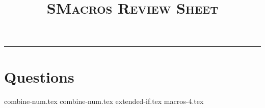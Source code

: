 \documentclass{exam}
\title{\textsc{SMacros Review Sheet}}
\begin{document}
\maketitle
\rule{\textwidth}{0.15em}
\fontsize{12}{15}\selectfont

\section{Questions}
\begin{questions}
{combine-num.tex}
{combine-num.tex}
{extended-if.tex}
{macros-4.tex}
\end{questions}
\end{document}
